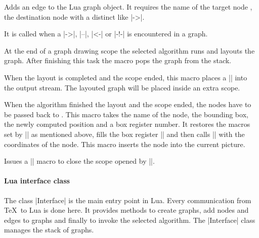\begin{command}{\pgfgdaddedge{}}
  Adds an edge to the Lua graph object. It requires the name of the target node , the destination node  with a distinct  like |->|.

  It is called when a |->|, |--|, |<-| or |-!-| is encountered in a graph.
\end{command}

\begin{command}{\pgfgdendscope}
  At the end of a graph drawing scope the selected algorithm runs and layouts the graph. After finishing this task the macro pops the graph from the stack.
\end{command}

\begin{command}{\pgfgdbeginshipout}
  When the layout is completed and the scope ended, this macro places a |\scope| into the output stream. The layouted graph will be placed inside an extra scope.
\end{command}

\begin{command}{\pgfgdinternalshipoutnode{}}
  When the algorithm finished the layout and the scope ended, the nodes have to be passed back to \tikzname. This macro takes the name of the node, the bounding box, the newly computed position and a box register number. It restores the macros set by |\pgfpositionnodelater| as mentioned above, fills the box register |\pgfpositionnodelaterbox| and then calls |\pgfpositionnodenow| with the coordinates of the node. This macro inserts the node into the current picture.
\end{command}

\begin{command}{\pgfgdendshipout}
  Issues a |\endscope| macro to close the scope opened by |\pgfgdbeginshipout|.
\end{command}

\paragraph{Lua interface class}

The class |Interface| is the main entry point in Lua. Every communication from \TeX\ to Lua is done here.
It provides methods to create graphs, add nodes and edges to graphs and finally to invoke the selected algorithm. The |Interface| class manages the stack of graphs.

